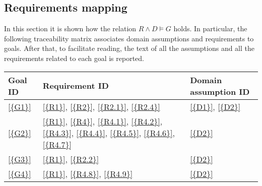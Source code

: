\subsection{Requirements mapping}
In this section it is shown how the relation $R\land D \models G$ holds.
In particular, the following traceability matrix associates domain assumptions and requirements to goals.
After that, to facilitate reading, the text of all the assumptions and all the requirements related to each goal is reported.

\begin{table}[H]
      \centering
      \begin{tabular}{|l|p{8cm}|p{5cm}|}
            \hline
            \textbf{Goal ID} & \textbf{Requirement ID}                                                                                                                                                                                                      & \textbf{Domain assumption ID}                                                      \\\hline
            \ref{{G1}}       & \ref{{R1}}, \ref{{R2}}, \ref{{R2.1}}, \ref{{R2.4}}                                                                                                                                                                           & \ref{{D1}}, \ref{{D2}}                                                             \\\hline
            \ref{{G2}}       & \ref{{R1}}, \ref{{R4}}, \ref{{R4.1}}, \ref{{R4.2}}, \ref{{R4.3}}, \ref{{R4.4}}, \ref{{R4.5}}, \ref{{R4.6}}, \ref{{R4.7}}                                                                                                     & \ref{{D2}}                                                                         \\\hline
            \ref{{G3}}       & \ref{{R1}}, \ref{{R2.2}}                                                                                                                                                                                                     & \ref{{D2}}                                                                         \\\hline
            \ref{{G4}}       & \ref{{R1}}, \ref{{R4.8}}, \ref{{R4.9}}                                                                                                                                                                                       & \ref{{D2}}                                                                         \\\hline

\end{tabular}
\end{table}
